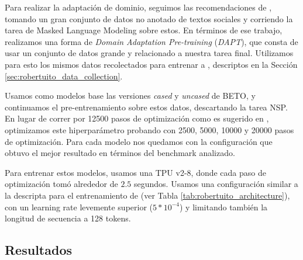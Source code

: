 Para realizar la adaptación de dominio, seguimos las recomendaciones de \citet{gururangan-etal-2020-dont}, tomando un gran conjunto de datos no anotado de textos sociales y corriendo la tarea de Masked Language Modeling sobre estos. En términos de ese trabajo, realizamos una forma de \emph{Domain Adaptation Pre-training} (\emph{DAPT}), que consta de usar un conjunto de datos grande y relacionado a nuestra tarea final. Utilizamos para esto los mismos datos recolectados para entrenar a \robertuito{}, descriptos en la Sección \ref{sec:robertuito_data_collection}.

Usamos como modelos base las versiones \emph{cased} y \emph{uncased} de BETO, y continuamos el pre-entrenamiento sobre estos datos, descartando la tarea NSP. En lugar de correr por \num{12500} pasos de optimización como es sugerido en \citet{gururangan-etal-2020-dont}, optimizamos este hiperparámetro probando con \num{2500}, \num{5000}, \num{10000} y \num{20000} pasos de optimización. Para cada modelo nos quedamos con la configuración que obtuvo el mejor resultado en términos del benchmark analizado.

Para entrenar estos modelos, usamos una TPU v2-8, donde cada paso de optimización tomó alrededor de $2.5$ segundos. Usamos una configuración similar a la descripta para el entrenamiento de \robertuito{} (ver Tabla \ref{tab:robertuito_architecture}), con un learning rate levemente superior ($5 * 10^{-4}$) y limitando también la longitud de secuencia a 128 tokens.

\subsection{Resultados}
\label{sec:domain_adaptation_results}


